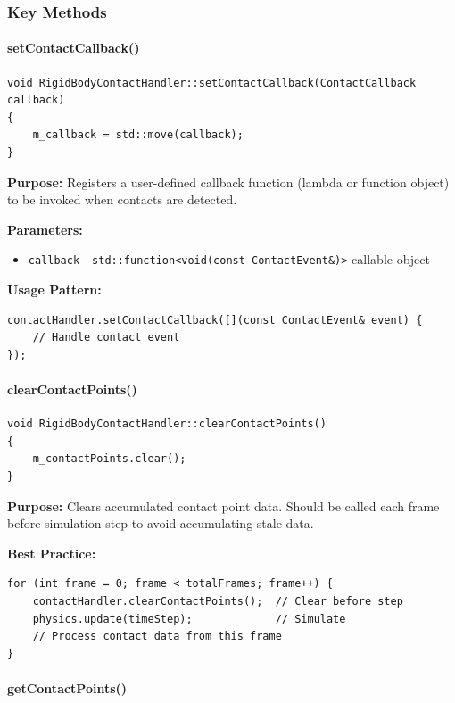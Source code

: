 \subsubsection{Key Methods}

\paragraph{setContactCallback()}

\begin{lstlisting}[style=cpp]
void RigidBodyContactHandler::setContactCallback(ContactCallback callback)
{
    m_callback = std::move(callback);
}
\end{lstlisting}

\textbf{Purpose:} Registers a user-defined callback function (lambda or function object) to be invoked when contacts are detected.

\textbf{Parameters:}
\begin{itemize}
    \item \texttt{callback} - \texttt{std::function<void(const ContactEvent\&)>} callable object
\end{itemize}

\textbf{Usage Pattern:}
\begin{lstlisting}[style=cpp]
contactHandler.setContactCallback([](const ContactEvent& event) {
    // Handle contact event
});
\end{lstlisting}

\paragraph{clearContactPoints()}

\begin{lstlisting}[style=cpp]
void RigidBodyContactHandler::clearContactPoints()
{
    m_contactPoints.clear();
}
\end{lstlisting}

\textbf{Purpose:} Clears accumulated contact point data. Should be called each frame before simulation step to avoid accumulating stale data.

\textbf{Best Practice:}
\begin{lstlisting}[style=cpp]
for (int frame = 0; frame < totalFrames; frame++) {
    contactHandler.clearContactPoints();  // Clear before step
    physics.update(timeStep);             // Simulate
    // Process contact data from this frame
}
\end{lstlisting}

\paragraph{getContactPoints()}

